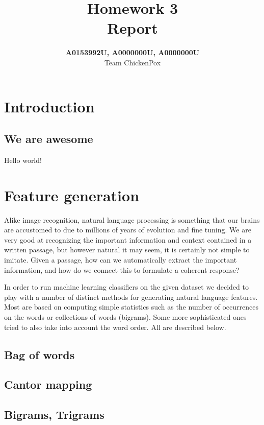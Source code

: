 \documentclass[a4paper]{article}
\title{Homework 3 \\ \large Report}
\author{\textbf{A0153992U, A0000000U, A0000000U} \\ Team ChickenPox}
\date{}
\numberwithin{equation}{section}
\begin{document}
\maketitle

\section{Introduction}

\subsection{We are awesome}

Hello world!

\section{Feature generation}

Alike image recognition, natural language processing is something that our brains are accustomed to due to millions of years of evolution and fine tuning. We are very good at recognizing the important information and context contained in a written passage, but however natural it may seem, it is certainly not simple to imitate. Given a passage, how can we automatically extract the important information, and how do we connect this to formulate a coherent response?

In order to run machine learning classifiers on the given dataset we decided to play with a number of distinct methods for generating natural language features. Most are based on computing simple statistics such as the number of occurrences on the words or collections of words (bigrams). Some more sophisticated ones tried to also take into account the word order. All are described below.

\subsection{Bag of words}



\subsection{Cantor mapping}

\subsection{Bigrams, Trigrams}
\end{document}
